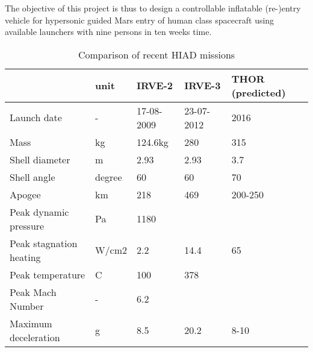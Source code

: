 The objective of this project is thus to design a controllable inflatable (re-)entry vehicle for hypersonic guided Mars entry of human class spacecraft using available launchers with nine persons in ten weeks time.

\vspace{-20mm}
\begin{table}[ht!]
	\caption{Comparison of recent HIAD missions}%
		\begin{tabular}{|p{}|p{}|p{}|p{}|p{}|} %
			\hline

           &       unit &     IRVE-2 \cite{irve2} &     IRVE-3 \citep{irve3,thor} & THOR (predicted) \citep{thor} \\
			\hline

Launch date &          - & 17-08-2009 & 23-07-2012 &       2016 \\
			\hline

      Mass &         kg &    124.6kg &        280 &        315 \\
			\hline

Shell diameter &          m &       2.93 &       2.93 &        3.7 \\
			\hline

Shell angle &     degree &         60 &         60 &         70 \\
			\hline

    Apogee &         km &        218 &        469 &    200-250 \\
			\hline

Peak dynamic pressure &         Pa &       1180 &            &            \\
			\hline

Peak stagnation heating &      W/cm2 &        2.2 &       14.4 &         65 \\
			\hline

Peak temperature &          C &        100 &        378 &            \\
			\hline

Peak Mach Number &          - &        6.2 &            &            \\
			\hline

Maximum deceleration &          g &        8.5 &       20.2 &       8-10 \\
			\hline

		\end{tabular}
    \label{tab:hiadcomparison}%
\end{table}


